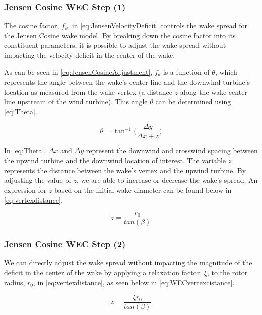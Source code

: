 \documentclass[a4paper]{jpconf}
\begin{document}
\subsubsection{Jensen Cosine WEC Step (1)} 

The cosine factor, $f_\theta$, in \cref{eq:JensenVelocityDeficit} controls the wake spread for the Jensen Cosine wake model. By breaking down the cosine factor into its constituent parameters, it is possible to adjust the wake spread without impacting the velocity deficit in the center of the wake.

As can be seen in \cref{eq:JensenCosineAdjustment}, $f_\theta$ is a function of $\theta$, which represents the angle between the wake's center line and the downwind turbine's location as measured from the wake vertex (a distance $z$ along the wake center line upstream of the wind turbine). This angle $\theta$ can be determined using \cref{eq:Theta}.

\begin{equation}
\theta = \tan^{-1}\Big( \frac{\Delta y}{\Delta x + z} \Big)
\label{eq:Theta}
\end{equation}

In \cref{eq:Theta}, $\Delta x$ and $\Delta y$ represent the downwind and crosswind spacing between the upwind turbine and the downwind location of interest. The variable $z$ represents the distance between the wake's vertex and the upwind turbine. By adjusting the value of $z$, we are able to increase or decrease the wake's spread. An expression for $z$ based on the initial wake diameter can be found below in \cref{eq:vertexdistance}.

\begin{equation}
z = \frac{r_0}{tan(\beta)}
\label{eq:vertexdistance}
\end{equation} 


\subsubsection{Jensen Cosine WEC Step (2)}
We can directly adjust the wake spread without impacting the magnitude of the deficit in the center of the wake by applying a relaxation factor, $\xi$, to the rotor radius, $r_0$, in \cref{eq:vertexdistance}, as seen below in \cref{eq:WECvertexcistance}.

\begin{equation}
z = \frac{\xi r_0}{tan(\beta)}
\label{eq:WECvertexcistance}
\end{equation}
\end{document}
